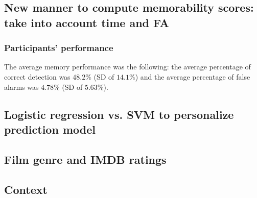 \documentclass[sigconf]{acmart}
\begin{document}
\subsection{New manner to compute memorability scores: take into account time and FA}



\subsubsection{Participants' performance}
The average memory performance was the following: the average percentage of correct detection was $48.2\%$ (SD of $14.1\%$) and the average percentage of false alarms was $4.78\%$ (SD of $5.63\%$).


\subsection{Logistic regression vs. SVM to personalize prediction model}




\subsection{Film genre and IMDB ratings}

\subsection{Context}
\end{document}
